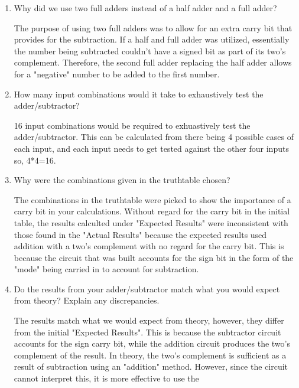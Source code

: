 \documentclass[11pt]{article}
\begin{document}
\begin{enumerate}
	
	
	\item Why did we use two full adders instead of a half adder and a full adder?
	
	The purpose of using two full adders was to allow for an extra carry bit that provides for the subtraction. If a half and full adder was utilized, essentially the number being subtracted couldn't have a signed bit as part of its two's complement. Therefore, the second full adder replacing the half adder allows for a "negative" number to be added to the first number. 
	
	\item How many input combinations would it take to exhaustively test the adder/subtractor?
	
	16 input combinations would be required to exhuastively test the adder/subtractor. This can be calculated from there being 4 possible cases of each input, and each input needs to get tested against the other four inputs so, 4*4=16.
	
	\item Why  were  the  combinations  given  in  the  truthtable chosen? 
	
	The combinations in the truthtable were picked to show the importance of a carry bit in your calculations. Without regard for the carry bit in the initial table, the results calculted under "Expected Results" were inconsistent with those found in the "Actual Results" because the expected results used addition with a two's complement with no regard for the carry bit. This is because the circuit that was built accounts for the sign bit in the form of the "mode" being carried in to account for subtraction.
	
	\item Do the results from your adder/subtractor match what  you  would  expect  from  theory?   Explain any discrepancies.
	
	The results match what we would expect from theory, however, they differ from the initial "Expected Results". This is because the subtractor circuit accounts for the sign carry bit, while the addition circuit produces the two's complement of the result. In theory, the two's complement is sufficient as a result of subtraction using an "addition" method. However, since the circuit cannot interpret this, it is more effective to use the 
	
\end{enumerate}
\end{document}

